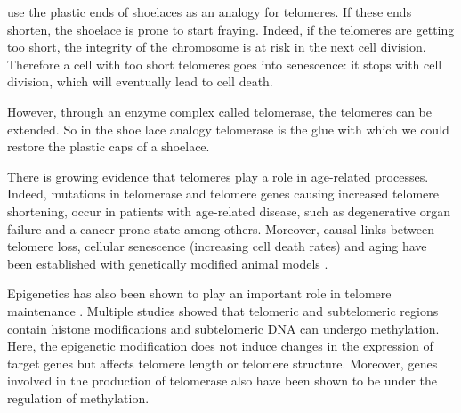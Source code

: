 \documentclass[
  11pt,
]{book}
\begin{document}
\citet{BlackburnEpel2017} use the plastic ends of shoelaces as an analogy for telomeres. If these ends shorten, the shoelace is prone to start fraying. Indeed, if the telomeres are getting too short, the integrity of the chromosome is at risk in the next cell division. Therefore a cell with too short telomeres goes into senescence: it stops with cell division, which will eventually lead to cell death.

However, through an enzyme complex called telomerase, the telomeres can be extended. So in the shoe lace analogy telomerase is the glue with which we could restore the plastic caps of a shoelace.

There is growing evidence that telomeres play a role in age-related processes. Indeed, mutations in telomerase and telomere genes causing increased telomere shortening, occur in patients with age-related disease, such as degenerative organ failure and a cancer-prone state among others. Moreover, causal links between telomere loss, cellular senescence (increasing cell death rates) and aging have been established with genetically modified animal models \citep{Adwan2018}.

Epigenetics has also been shown to play an important role in telomere maintenance \citep{Adwan2018}.
Multiple studies showed that telomeric and subtelomeric regions contain histone modifications and subtelomeric DNA can undergo methylation.
Here, the epigenetic modification does not induce changes in the expression of target genes but affects telomere length or telomere structure.
Moreover, genes involved in the production of telomerase also have been shown to be under the regulation of methylation.
\end{document}
